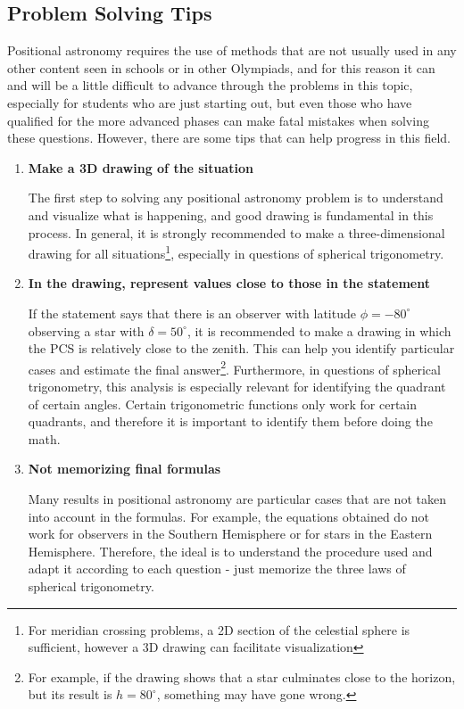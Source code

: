 \documentclass[a4paper,12pt]{extarticle}
\begin{document}
\subsection{Problem Solving Tips}

Positional astronomy requires the use of methods that are not usually used in any other content seen in schools or in other Olympiads, and for this reason it can and will be a little difficult to advance through the problems in this topic, especially for students who are just starting out, but even those who have qualified for the more advanced phases can make fatal mistakes when solving these questions. However, there are some tips that can help progress in this field.

\begin{enumerate}
	\itemsep0em 
	\item \textbf{Make a 3D drawing of the situation}
	
	The first step to solving any positional astronomy problem is to understand and visualize what is happening, and good drawing is fundamental in this process. In general, it is strongly recommended to make a three-dimensional drawing for all situations\footnote{For meridian crossing problems, a 2D section of the celestial sphere is sufficient, however a 3D drawing can facilitate visualization}, especially in questions of spherical trigonometry.
	
	\item \textbf{In the drawing, represent values close to those in the statement}
	
	If the statement says that there is an observer with latitude $\phi = -80^\circ$ observing a star with $\delta = 50^\circ$, it is recommended to make a drawing in which the PCS is relatively close to the zenith. This can help you identify particular cases and estimate the final answer\footnote{For example, if the drawing shows that a star culminates close to the horizon, but its result is $h = 80^\circ$, something may have gone wrong.}. Furthermore, in questions of spherical trigonometry, this analysis is especially relevant for identifying the quadrant of certain angles. Certain trigonometric functions only work for certain quadrants, and therefore it is important to identify them before doing the math.
	
	\item \textbf{Not memorizing final formulas}
	
	Many results in positional astronomy are particular cases that are not taken into account in the formulas. For example, the equations obtained do not work for observers in the Southern Hemisphere or for stars in the Eastern Hemisphere. Therefore, the ideal is to understand the procedure used and adapt it according to each question - just memorize the three laws of spherical trigonometry.
	

\end{enumerate}
\end{document}
